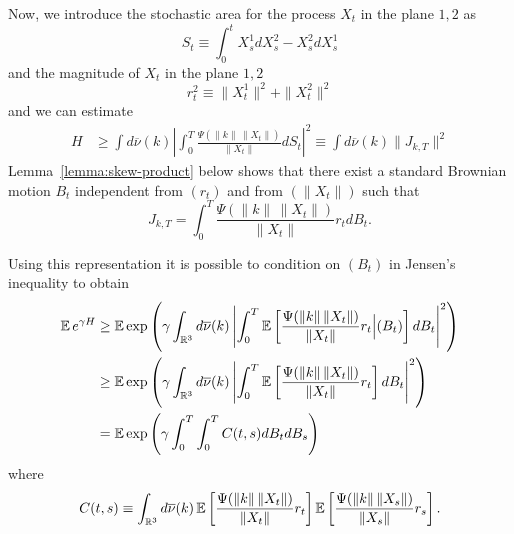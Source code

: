 Now, we introduce the stochastic area for the process $X_t$ in the plane
$1,2$ as
$$
S_t \equiv \int_0^t X_s^1 dX_s^2 - X_s^2 dX_s^1
$$
and the magnitude of $X_t$ in the plane $1,2$
$$
r^2_t \equiv \|X_t^1\|^2 + \|X_t^2\|^2
$$
and we can estimate
\begin{equation*}
\begin{split}
H & \ge 
\int d\overline{\nu}(k)
\left|\int_{0}^{T} \frac{\Psi(\|k\|\,\|X_t\|)}{\|X_t\|}  
   dS_t
\right|^2 
\equiv
\int d\overline{\nu}(k)
\|J_{k,T}\|^2
\end{split}
\end{equation*}
Lemma~\ref{lemma:skew-product} below shows that there exist a standard
Brownian motion $B_t$ independent from $(r_t)$ and from $(\|X_t\|)$  such that 
\begin{equation}
J_{k,T} = \int_0^T  \frac{\Psi(\|k\|\,\|X_t\|)}{\|X_t\|} r_t dB_t.
\label{eq:representation}
\end{equation}

Using this representation it is possible to  condition on $(B_t)$ in Jensen's
inequality to obtain
\begin{equation*}
\begin{split}
\operatorname{{\mathbb E}} e^{\gamma H} & \ge  
\operatorname{{\mathbb E}} \exp \left( \gamma \int_{\mathbb{R}^3} d\overline{\nu}(k)  
\left| 
\int_0^T  \operatorname{{\mathbb E}} \left[ \frac{\Psi(\|k\|\,\|X_t\|)}{\|X_t\|} r_t  \Big | (B_t)
\right]  dB_t
\right|^2  \right) \\
 & \ge  
\operatorname{{\mathbb E}} \exp \left( \gamma \int_{\mathbb{R}^3} d\overline{\nu}(k)
\left| 
\int_0^T  \operatorname{{\mathbb E}} \left[  \frac{\Psi(\|k\|\,\|X_t\|)}{\|X_t\|} r_t  
\right]  dB_t
\right|^2  \right) \\
&  =   
\operatorname{{\mathbb E}} \exp \left( \gamma  
\int_0^T  \int_0^T  C(t,s) dB_t dB_s 
\right) \\
\end{split}
\end{equation*}
where
$$
C(t,s) \equiv   \int_{\mathbb{R}^3} d\overline{\nu}(k) 
\operatorname{{\mathbb E}} \left[  \frac{\Psi(\|k\|\,\|X_t\|)}{\|X_t\|} r_t
\right]
\operatorname{{\mathbb E}} \left[  \frac{\Psi(\|k\|\,\|X_s\|)}{\|X_s\|} r_s \right].
$$

